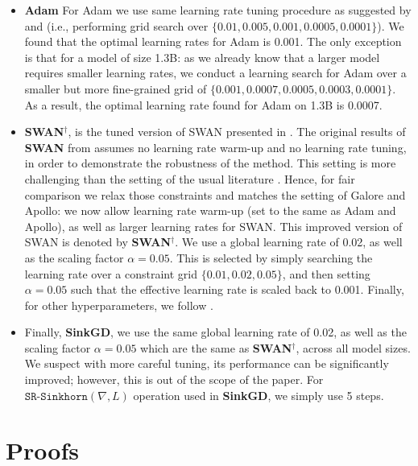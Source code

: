 \begin{itemize}
    \item \textbf{Adam}  For Adam we use same learning rate tuning procedure as suggested by \cite{Zhao2024GaLoreML} and \cite{ma2024swansgdnormalizationwhitening} (i.e., performing grid search over $\{0.01, 0.005, 0.001, 0.0005, 0.0001\}$). We found that the optimal learning rates for Adam is 0.001. The only exception is that for a model of size 1.3B: as we already know that a larger model requires smaller learning rates, we conduct a learning search for Adam over a smaller but more fine-grained grid of $\{ 0.001, 0.0007, 0.0005, 0.0003, 0.0001\}$. As a result, the optimal learning rate found for Adam on 1.3B is 0.0007.
    
    \item \textbf{SWAN}$^\dag$, is the tuned version of SWAN presented in \cite{ma2024swansgdnormalizationwhitening}. The original results of \textbf{SWAN} from \citet{ma2024swansgdnormalizationwhitening} assumes no learning rate warm-up and no learning rate tuning, in order to demonstrate the robustness of the method. This setting is more challenging than the setting of the usual literature \citep{Zhao2024GaLoreML, zhu2024apollo}. Hence, for fair comparison we relax those constraints and matches the setting of Galore and Apollo: we now allow learning rate warm-up (set to the same as Adam and Apollo), as well as larger learning rates for SWAN. This improved version of SWAN is denoted by \textbf{SWAN}$^\dag$. We use a global learning rate of 0.02, as well as the scaling factor $\alpha = 0.05$. This is selected by simply searching the learning rate over a constraint grid $\{0.01, 0.02, 0.05\}$, and then setting $\alpha = 0.05$ such that the effective learning rate is scaled back to 0.001. Finally, for other hyperparameters, we follow \cite{ma2024swansgdnormalizationwhitening}. 

    \item Finally, \textbf{SinkGD}, we use the same global learning rate of 0.02, as well as the scaling factor $\alpha = 0.05$ which are the same as \textbf{SWAN}$^\dag$, across all model sizes. We suspect with more careful tuning, its performance can be significantly improved; however, this is out of the scope of the paper. For $\texttt{SR-Sinkhorn}(\nabla,L)$ operation used in \textbf{SinkGD}, we simply use 5 steps.
\end{itemize}


\section{Proofs}

